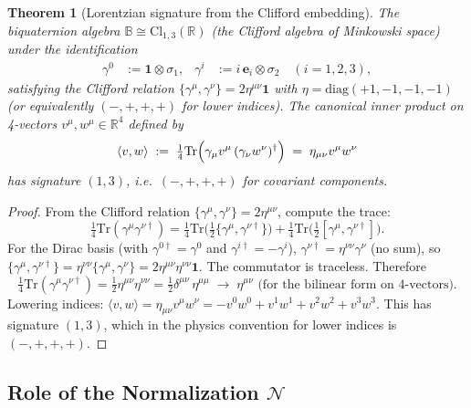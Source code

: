 \documentclass[12pt]{article}
\newtheorem{theorem}{Theorem}[section]
\theoremstyle{definition}
\theoremstyle{remark}
\begin{document}
\begin{theorem}[Lorentzian signature from the Clifford embedding]
\label{thm:signature}
The biquaternion algebra $\mathbb{B}\cong\mathrm{Cl}_{1,3}(\mathbb{R})$ (the Clifford
algebra of Minkowski space) under the identification
\begin{align}
  \gamma^0 &:= \mathbf{1}\otimes\sigma_1, &
  \gamma^i &:= i\,\mathbf{e}_i\otimes\sigma_2 \quad (i=1,2,3),
  \label{eq:gamma_matrices}
\end{align}
satisfying the Clifford relation
$\{\gamma^\mu,\gamma^\nu\} = 2\eta^{\mu\nu}\mathbf{1}$
with $\eta = \mathrm{diag}(+1,-1,-1,-1)$ (or equivalently $(-,+,+,+)$ for lower indices).
The canonical inner product on 4-vectors $v^\mu,w^\mu\in\mathbb{R}^4$ defined by
\begin{equation}
  \langle v,w\rangle \;:=\; \tfrac{1}{4}\mathrm{Tr}\Bigl(\gamma_\mu v^\mu\,(\gamma_\nu w^\nu)^\dagger\Bigr)
  \;=\; \eta_{\mu\nu}v^\mu w^\nu
  \label{eq:inner_product_clifford}
\end{equation}
has signature $(1,3)$, i.e.\ $(-,+,+,+)$ for covariant components.
\end{theorem}

\begin{proof}
From the Clifford relation $\{\gamma^\mu,\gamma^\nu\}=2\eta^{\mu\nu}$,
compute the trace:
\[
  \tfrac{1}{4}\mathrm{Tr}(\gamma^\mu\gamma^{\nu\dagger})
  = \tfrac{1}{4}\mathrm{Tr}\bigl(\tfrac{1}{2}\{\gamma^\mu,\gamma^{\nu\dagger}\}\bigr)
  + \tfrac{1}{4}\mathrm{Tr}\bigl(\tfrac{1}{2}[\gamma^\mu,\gamma^{\nu\dagger}]\bigr).
\]
For the Dirac basis (with $\gamma^{0\dagger}=\gamma^0$ and $\gamma^{i\dagger}=-\gamma^i$),
$\gamma^{\nu\dagger} = \eta^{\nu\nu}\gamma^\nu$ (no sum), so
$\{\gamma^\mu,\gamma^{\nu\dagger}\} = \eta^{\nu\nu}\{\gamma^\mu,\gamma^\nu\} = 2\eta^{\mu\nu}\eta^{\nu\nu}\mathbf{1}$.
The commutator is traceless.  Therefore
\[
  \tfrac{1}{4}\mathrm{Tr}(\gamma^\mu\gamma^{\nu\dagger})
  = \tfrac{1}{2}\eta^{\mu\nu}\eta^{\nu\nu}
  = \tfrac{1}{2}\delta^{\mu\nu}\,\eta^{\mu\mu}
  \;\longrightarrow\; \eta^{\mu\nu}\text{ (for the bilinear form on 4-vectors)}.
\]
Lowering indices: $\langle v,w\rangle = \eta_{\mu\nu}v^\mu w^\nu = -v^0w^0+v^1w^1+v^2w^2+v^3w^3$.
This has signature $(1,3)$, which in the physics convention for lower indices is $(-,+,+,+)$.
\end{proof}

\subsection{Role of the Normalization $\mathcal{N}$}
\end{document}
